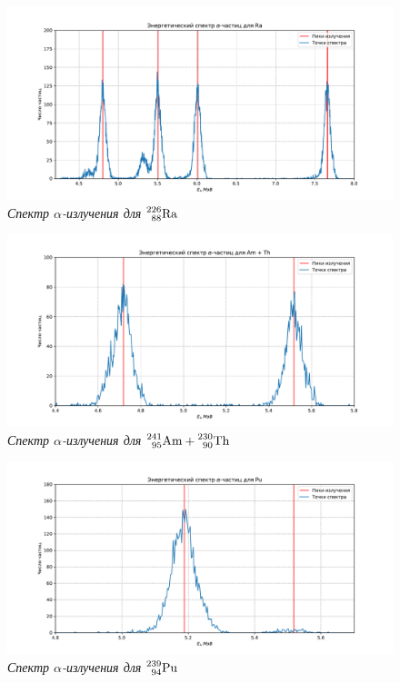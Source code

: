 \documentclass[a4paper,12pt]{article}
\begin{document}
\FloatBarrier
\begin{figure}[!ht]
	\includegraphics[width=1.1\textwidth]{plots/specter_Ra.pdf}
	\caption{\textit{Спектр $\alpha$-излучения для $\prescript{226}{88}{\text{Ra}}$}}
	\label{graph:Ra}
\end{figure}

\begin{figure}[!ht]
	\includegraphics[width=1.1\textwidth]{plots/specter_Am_Th.pdf}
	\caption{\textit{Спектр $\alpha$-излучения для $\prescript{241}{95}{\text{Am}} + \prescript{230}{90}{\text{Th}}$}}
	\label{graph:Am_Th}
\end{figure}

\begin{figure}[!ht]
	\includegraphics[width=1.1\textwidth]{plots/specter_Pu.pdf}
	\caption{\textit{Спектр $\alpha$-излучения для $\prescript{239}{94}{\text{Pu}}$}}
	\label{graph:Pu}
\end{figure}
\end{document}
